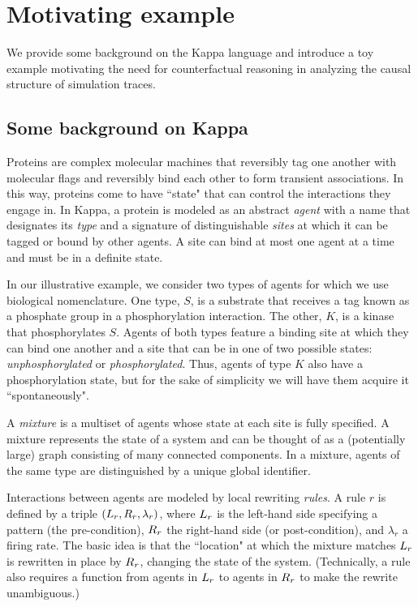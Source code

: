 
\section{Motivating example}\label{sec:example}

We provide some background on the Kappa language and introduce a toy
example motivating the need for counterfactual reasoning in analyzing
the causal structure of simulation traces.

\subsection{Some background on Kappa}\label{sec:background}

Proteins are complex molecular machines that reversibly tag one
another with molecular flags and reversibly bind each other to form
transient associations.  In this way, proteins come to have ``state"
that can control the interactions they engage in. In Kappa, a protein
is modeled as an abstract \emph{agent} with a name that designates its
\emph{type} and a signature of distinguishable \emph{sites} at which
it can be tagged or bound by other agents. A site can bind at most one
agent at a time and must be in a definite state.

In our illustrative example, we consider two types of agents for which
we use biological nomenclature. One type, $S$, is a substrate that
receives a tag known as a phosphate group in a phosphorylation
interaction. The other, $K$, is a kinase that phosphorylates
$S$. Agents of both types feature a binding site at which they can
bind one another and a site that can be in one of two possible states:
\emph{unphosphorylated} or \emph{phosphorylated}. Thus, agents of type
$K$ also have a phosphorylation state, but for the sake of simplicity
we will have them acquire it ``spontaneously".

A \emph{mixture} is a multiset of agents whose state at each site is
fully specified. A mixture represents the state of a system and can be
thought of as a (potentially large) graph consisting of many connected
components. In a mixture, agents of the same type are distinguished by
a unique global identifier. %



Interactions between agents are modeled by local rewriting
\emph{rules}.  A rule $r$ is defined by a triple
$(L_{r}, R_{r}, \lambda_r)$, where $L_{r}$ is the left-hand
side specifying a pattern (the pre-condition), $R_{r}$ the
right-hand side (or post-condition), and $\lambda_r$ a firing rate.
The basic idea is that the ``location" at which the mixture matches
$L_{r}$ is rewritten in place by $R_{r}$, changing the state of
the system. (Technically, a rule also requires a function from agents
in $L_{r}$ to agents in $R_{r}$ to make the rewrite
unambiguous.)

